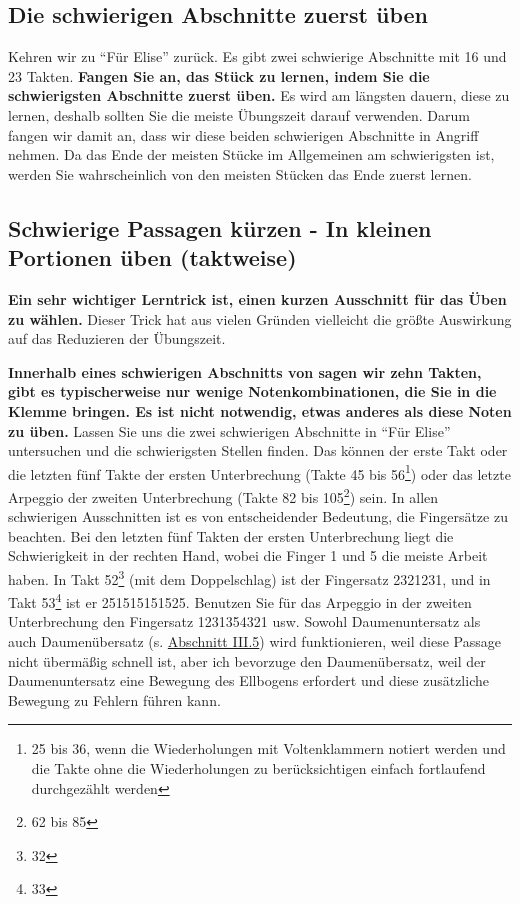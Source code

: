 
\label{c1ii5}


\subsection{Die schwierigen Abschnitte zuerst üben}

Kehren wir zu \enquote{Für Elise} zurück.
Es gibt zwei schwierige Abschnitte mit 16 und 23 Takten.
\textbf{Fangen Sie an, das Stück zu lernen, indem Sie die schwierigsten Abschnitte zuerst üben.}
Es wird am längsten dauern, diese zu lernen, deshalb sollten Sie die meiste Übungszeit darauf verwenden.
Darum fangen wir damit an, dass wir diese beiden schwierigen Abschnitte in Angriff nehmen.
Da das Ende der meisten Stücke im Allgemeinen am schwierigsten ist, werden Sie wahrscheinlich von den meisten Stücken das Ende zuerst lernen.
 

\subsection{Schwierige Passagen kürzen - In kleinen Portionen üben (taktweise)}
\label{c1ii6}

\textbf{Ein sehr wichtiger Lerntrick ist, einen kurzen Ausschnitt für das Üben zu wählen.}
Dieser Trick hat aus vielen Gründen vielleicht die größte Auswirkung auf das Reduzieren der Übungszeit.

\textbf{Innerhalb eines schwierigen Abschnitts von sagen wir zehn Takten, gibt es typischerweise nur wenige Notenkombinationen, die Sie in die Klemme bringen.
Es ist nicht notwendig, etwas anderes als diese Noten zu üben.}
Lassen Sie uns die zwei schwierigen Abschnitte in \enquote{Für Elise} untersuchen und die schwierigsten Stellen finden.
Das können der erste Takt oder die letzten fünf Takte der ersten Unterbrechung (Takte 45 bis 56\footnote{25 bis 36, wenn die Wiederholungen mit Voltenklammern notiert werden und die Takte ohne die Wiederholungen zu berücksichtigen einfach fortlaufend durchgezählt werden}) oder das letzte Arpeggio der zweiten Unterbrechung (Takte 82 bis 105\footnote{62 bis 85}) sein.
In allen schwierigen Ausschnitten ist es von entscheidender Bedeutung, die Fingersätze zu beachten.
Bei den letzten fünf Takten der ersten Unterbrechung liegt die Schwierigkeit in der rechten Hand, wobei die Finger 1 und 5 die meiste Arbeit haben.
In Takt 52\footnote{32} (mit dem Doppelschlag) ist der Fingersatz 2321231, und in Takt 53\footnote{33} ist er 251515151525.
Benutzen Sie für das Arpeggio in der zweiten Unterbrechung den Fingersatz 1231354321 usw.
Sowohl Daumenuntersatz als auch Daumenübersatz (s. \hyperref[c1iii5]{Abschnitt III.5}) wird funktionieren, weil diese Passage nicht übermäßig schnell ist, aber ich bevorzuge den Daumenübersatz, weil der Daumenuntersatz eine Bewegung des Ellbogens erfordert und diese zusätzliche Bewegung zu Fehlern führen kann.

